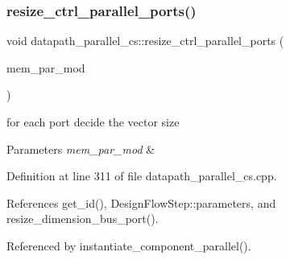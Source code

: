 \subsubsection{\texorpdfstring{resize\+\_\+ctrl\+\_\+parallel\+\_\+ports()}{resize\_ctrl\_parallel\_ports()}}
{\footnotesize\ttfamily void datapath\+\_\+parallel\+\_\+cs\+::resize\+\_\+ctrl\+\_\+parallel\+\_\+ports (\begin{DoxyParamCaption}\item[{\hyperlink{structural__objects_8hpp_a8ea5f8cc50ab8f4c31e2751074ff60b2}{structural\+\_\+object\+Ref}}]{mem\+\_\+par\+\_\+mod }\end{DoxyParamCaption})\hspace{0.3cm}{\ttfamily [protected]}}



for each port decide the vector size 


\begin{DoxyParams}{Parameters}
{\em mem\+\_\+par\+\_\+mod} & \\
\hline
\end{DoxyParams}


Definition at line 311 of file datapath\+\_\+parallel\+\_\+cs.\+cpp.



References get\+\_\+id(), Design\+Flow\+Step\+::parameters, and resize\+\_\+dimension\+\_\+bus\+\_\+port().



Referenced by instantiate\+\_\+component\+\_\+parallel().

